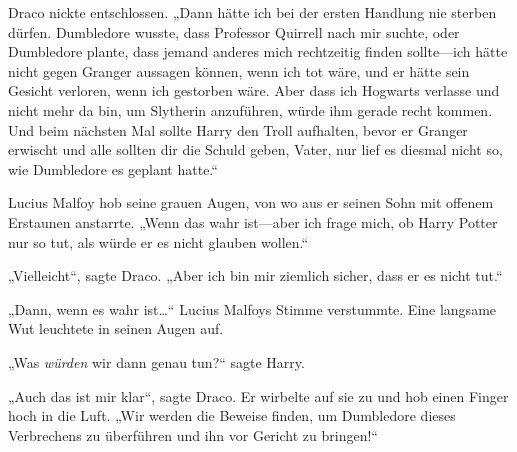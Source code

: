 Draco nickte entschlossen.
„Dann hätte ich bei der ersten Handlung nie sterben dürfen. Dumbledore wusste, dass Professor Quirrell nach mir suchte, oder Dumbledore plante, dass jemand anderes mich rechtzeitig finden sollte—ich hätte nicht gegen Granger aussagen können, wenn ich tot wäre, und er hätte sein Gesicht verloren, wenn ich gestorben wäre. Aber dass ich Hogwarts verlasse und nicht mehr da bin, um Slytherin anzuführen, würde ihm gerade recht kommen. Und beim nächsten Mal sollte Harry den Troll aufhalten, bevor er Granger erwischt und alle sollten dir die Schuld geben, Vater, nur lief es diesmal nicht so, wie Dumbledore es geplant hatte.“

Lucius Malfoy hob seine grauen Augen, von wo aus er seinen Sohn mit offenem Erstaunen anstarrte. „Wenn das wahr ist—aber ich frage mich, ob Harry Potter nur so tut, als würde er es nicht glauben wollen.“

„Vielleicht“, sagte Draco. „Aber ich bin mir ziemlich sicher, dass er es nicht tut.“

„Dann, wenn es wahr ist…“
Lucius Malfoys Stimme verstummte. Eine langsame Wut leuchtete in seinen Augen auf.

„Was \emph{würden} wir dann genau tun?“ sagte Harry.

„Auch das ist mir klar“, sagte Draco. Er wirbelte auf sie zu und hob einen Finger hoch in die Luft. „Wir werden die Beweise finden, um Dumbledore dieses Verbrechens zu überführen und ihn vor Gericht zu bringen!“

